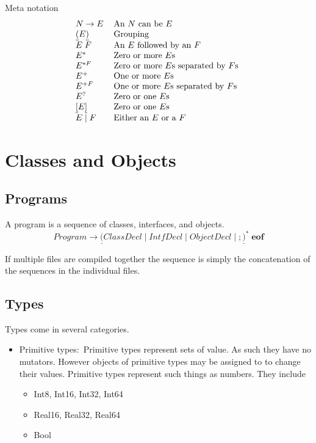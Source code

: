 \documentclass{article}%
\begin{document}
Meta notation%
\[%
\begin{tabular}
[c]{ll}%
$N\rightarrow E$ & An $N$ can be $E$\\
$\underline{(}E\underline{)}$ & Grouping\\
$E\;F$ & An $E$ followed by an $F$\\
$E^{\ast}$ & Zero or more $E$s\\
$E^{\ast F}$ & Zero or more $E$s separated by $F$s\\
$E^{+}$ & One or more $E$s\\
$E^{+F}$ & One or more $E$s separated by $F$s\\
$E^{?}$ & Zero or one $E$s\\
$\underline{\lbrack}E\underline{]}$ & Zero or one $E$s\\
$E\mid F$ & Either an $E$ or a $F$%
\end{tabular}
\
\]


\section{Classes and Objects}

\subsection{Programs}

A program is a sequence of classes, interfaces, and objects.%
\[
\mathit{Program}\rightarrow\underline{(}\mathit{ClassDecl}\mid
\mathit{IntfDecl}\mid\mathit{ObjectDecl}\mid\mathbf{;}\underline{)}^{\ast
}\;\mathbf{eof}%
\]


If multiple files are compiled together the sequence is simply the
concatenation of the sequences in the individual files.

\subsection{Types}

Types come in several categories.

\begin{itemize}
\item Primitive types:\ Primitive types represent sets of value. As such they
have no mutators. However objects of primitive types may be assigned to to
change their values. Primitive types represent such things as numbers. They include

\begin{itemize}
\item Int8, Int16, Int32, Int64

\item Real16, Real32, Real64

\item Bool
\end{itemize}
\end{itemize}
\end{document}
